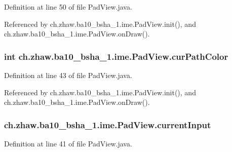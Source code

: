 Definition at line 50 of file PadView.java.

Referenced by ch.zhaw.ba10\_\-bsha\_\-1.ime.PadView.init(), and ch.zhaw.ba10\_\-bsha\_\-1.ime.PadView.onDraw().\hypertarget{classch_1_1zhaw_1_1ba10__bsha__1_1_1ime_1_1PadView_a9fdc4e6d121c7b8d5466b5f0148a6be6}{
\subsubsection[{curPathColor}]{\setlength{\rightskip}{0pt plus 5cm}int {\bf ch.zhaw.ba10\_\-bsha\_\-1.ime.PadView.curPathColor}}}
\label{classch_1_1zhaw_1_1ba10__bsha__1_1_1ime_1_1PadView_a9fdc4e6d121c7b8d5466b5f0148a6be6}


Definition at line 43 of file PadView.java.

Referenced by ch.zhaw.ba10\_\-bsha\_\-1.ime.PadView.init(), and ch.zhaw.ba10\_\-bsha\_\-1.ime.PadView.onDraw().\hypertarget{classch_1_1zhaw_1_1ba10__bsha__1_1_1ime_1_1PadView_a6ff45debae1b93ccc68f309c62fe6885}{
\subsubsection[{currentInput}]{ {\bf ch.zhaw.ba10\_\-bsha\_\-1.ime.PadView.currentInput}}}
\label{classch_1_1zhaw_1_1ba10__bsha__1_1_1ime_1_1PadView_a6ff45debae1b93ccc68f309c62fe6885}


Definition at line 41 of file PadView.java.

